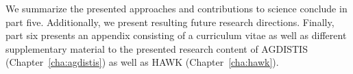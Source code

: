 We  summarize the presented approaches and contributions to science conclude in part five. 
Additionally, we present resulting future research directions.
Finally, part six presents an appendix consisting of a curriculum vitae as well as different supplementary material to the presented research content of AGDISTIS (Chapter~\ref{cha:agdistis}) as well as HAWK (Chapter~\ref{cha:hawk}).